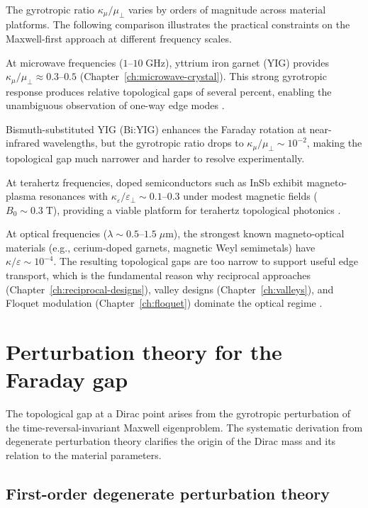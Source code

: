 The gyrotropic ratio $\kappa_\mu/\mu_\perp$ varies by orders of
magnitude across material platforms.  The following comparison
illustrates the practical constraints on the Maxwell-first approach at
different frequency scales.

At microwave frequencies ($1$--$10\;\mathrm{GHz}$), yttrium iron
garnet (YIG) provides $\kappa_\mu/\mu_\perp\approx 0.3$--$0.5$
(Chapter~\ref{ch:microwave-crystal}).  This strong gyrotropic response
produces relative topological gaps of several percent, enabling the
unambiguous observation of one-way edge modes
\cite{nature2026observation,skirlo2015experimental}.

Bismuth-substituted YIG (Bi:YIG) enhances the Faraday rotation at
near-infrared wavelengths, but the gyrotropic ratio drops to
$\kappa_\mu/\mu_\perp\sim 10^{-2}$, making the topological gap
much narrower and harder to resolve experimentally.

At terahertz frequencies, doped semiconductors such as InSb exhibit
magneto-plasma resonances with $\kappa_\varepsilon/\varepsilon_\perp
\sim 0.1$--$0.3$ under modest magnetic fields ($B_0\sim 0.3\;\mathrm{T}$),
providing a viable platform for terahertz topological photonics
\cite{price2022roadmap}.

At optical frequencies ($\lambda\sim 0.5$--$1.5\;\mu\mathrm{m}$), the
strongest known magneto-optical materials (e.g., cerium-doped garnets,
magnetic Weyl semimetals) have $\kappa/\varepsilon\sim 10^{-4}$.  The
resulting topological gaps are too narrow to support useful edge
transport, which is the fundamental reason why reciprocal approaches
(Chapter~\ref{ch:reciprocal-designs}), valley designs
(Chapter~\ref{ch:valleys}), and Floquet modulation
(Chapter~\ref{ch:floquet}) dominate the optical regime
\cite{ozawa2018topological}.

\section{Perturbation theory for the Faraday gap}
\label{sec:ch7-perturbation}

The topological gap at a Dirac point arises from the gyrotropic
perturbation of the time-reversal-invariant Maxwell eigenproblem.
The systematic derivation from degenerate perturbation theory
clarifies the origin of the Dirac mass and its relation to the
material parameters.

\subsection{First-order degenerate perturbation theory}
\label{sec:ch7-first-order}

